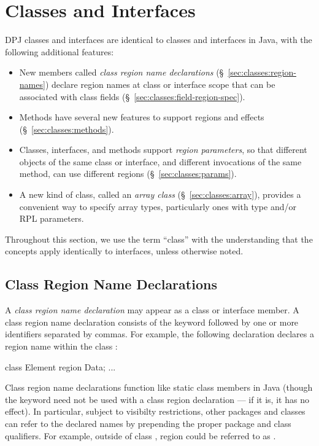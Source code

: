 \section{Classes and Interfaces%
\label{sec:classes}}

DPJ classes and interfaces are identical to classes and interfaces in
Java, with the following additional features:
%
\begin{itemize}
%
\item New members called \emph{class region name declarations}
  (\S~\ref{sec:classes:region-names}) declare region names at class or
  interface scope that can be associated with class fields
  (\S~\ref{sec:classes:field-region-spec}).
%
\item Methods have several new features to support regions and effects
  (\S~\ref{sec:classes:methods}).
%
\item Classes, interfaces, and methods support \emph{region
  parameters}, so that different objects of the same class or
  interface, and different invocations of the same method, can use
  different regions (\S~\ref{sec:classes:params}).
%
\item A new kind of class, called an \emph{array class}
  (\S~\ref{sec:classes:array}), provides a convenient way to specify
  array types, particularly ones with type and/or RPL parameters.
%
\end{itemize}
%
Throughout this section, we use the term ``class'' with the
understanding that the concepts apply identically to interfaces,
unless otherwise noted.

\subsection{Class Region Name Declarations%
\label{sec:classes:region-names}}

A \emph{class region name declaration} may appear as a class or
interface member.  A class region name declaration consists of the
keyword  followed by one or more identifiers separated by
commas. For example, the following declaration declares a region name
 within the class :

\begin{dpjlisting}
class Element {
	region Data;
	...
}
\end{dpjlisting}

Class region name declarations function like static class members in
Java (though the keyword  need not be used with a class
region declaration --- if it is, it has no effect).  In particular,
subject to visibilty restrictions, other packages and classes can
refer to the declared names by prepending the proper package and class
qualifiers.  For example, outside of class , region
 could be referred to as .


